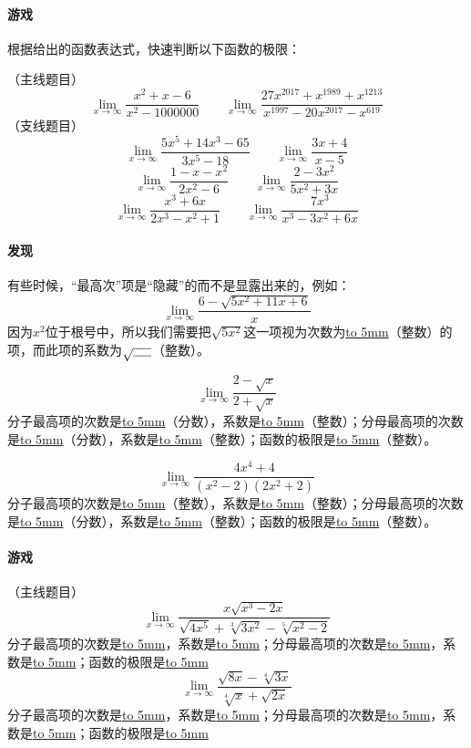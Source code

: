 \documentclass[UTF8]{ctexart}
\begin{document}
\paragraph{游戏}
根据给出的函数表达式，快速判断以下函数的极限：

（主线题目）
\[{\lim_{x \to \infty} \frac{x^2+x-6}{x^2-1000000}}  \qquad  {\lim_{x \to \infty} \frac{27x^{2017}+x^{1989}+x^{1213}}{x^{1997}-20x^{2017}-x^{619}}}\]
（支线题目）
\[{\lim_{x \to \infty} \frac{5x^5+14x^3-65}{3x^5-18}}  \qquad  {\lim_{x \to \infty} \frac{3x+4}{x-5}}\]
\[{\lim_{x \to \infty} \frac{1-x-x^2}{2x^2-6}}  \qquad  {\lim_{x \to \infty} \frac{2-3x^2}{5x^2+3x}}\]
\[{\lim_{x \to \infty} \frac{x^3+6x}{2x^3-x^2+1}}  \qquad  {\lim_{x \to \infty} \frac{7x^3}{x^3-3x^2+6x}}\]

\paragraph{发现}
有些时候，“最高次”项是“隐藏”的而不是显露出来的，例如：
\[{\lim_{x \to \infty} \frac{6-\sqrt{5x^2 + 11x + 6}}{x}}\]
因为$x^2$位于根号中，所以我们需要把$\sqrt{5x^2}$这一项视为次数为\underline{\hbox to 5mm{}}（整数）的项，而此项的系数为$\sqrt{\underline{\hbox to 5mm{}}}$（整数）。

\[{\lim_{x \to \infty} \frac{2-\sqrt{x}}{2+\sqrt{x}}}\]
分子最高项的次数是\underline{\hbox to 5mm{}}（分数），系数是\underline{\hbox to 5mm{}}（整数）；分母最高项的次数是\underline{\hbox to 5mm{}}（分数），系数是\underline{\hbox to 5mm{}}（整数）；函数的极限是\underline{\hbox to 5mm{}}（整数）。

\[{\lim_{x \to \infty} \frac{4x^4+4}{(x^2-2)(2x^2+2)}}\]
分子最高项的次数是\underline{\hbox to 5mm{}}（整数），系数是\underline{\hbox to 5mm{}}（整数）；分母最高项的次数是\underline{\hbox to 5mm{}}（分数），系数是\underline{\hbox to 5mm{}}（整数）；函数的极限是\underline{\hbox to 5mm{}}（整数）。

\paragraph{游戏}
（主线题目）
\[{\lim_{x \to \infty} \frac{x\sqrt{x^3-2x}}{\sqrt{4x^5}+\sqrt[3]{3x^2}-\sqrt[5]{x^2-2}}} \]
分子最高项的次数是\underline{\hbox to 5mm{}}，系数是\underline{\hbox to 5mm{}}；分母最高项的次数是\underline{\hbox to 5mm{}}，系数是\underline{\hbox to 5mm{}}；函数的极限是\underline{\hbox to 5mm{}}
\[{\lim_{x \to \infty} \frac{\sqrt{8x} - \sqrt[4]{3x}}{\sqrt[4]{x}+\sqrt{2x}}}\]
分子最高项的次数是\underline{\hbox to 5mm{}}，系数是\underline{\hbox to 5mm{}}；分母最高项的次数是\underline{\hbox to 5mm{}}，系数是\underline{\hbox to 5mm{}}；函数的极限是\underline{\hbox to 5mm{}}
\end{document}
